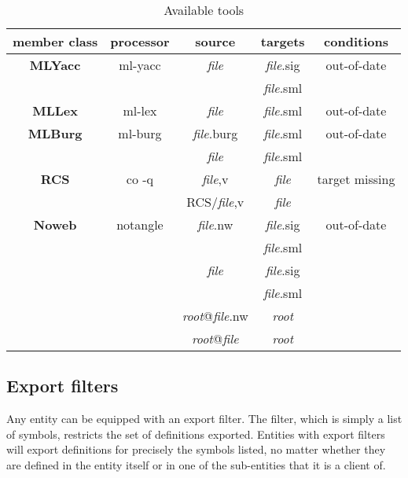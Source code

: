 \documentclass{article}
\begin{document}
\begin{table}
\begin{center}
\begin{tabular}{||c|c|c|c|c||}
\hline
member class & processor & source & targets & conditions \\
\hline\hline
{\bf MLYacc} & ml-yacc & {\em file} & {\em file}.sig & out-of-date \\
             &         &            & {\em file}.sml & \\
\hline
{\bf MLLex} & ml-lex & {\em file} & {\em file}.sml & out-of-date \\
\hline
{\bf MLBurg} & ml-burg & {\em file}.burg & {\em file}.sml & out-of-date \\
\cline{3-4}
             &         & {\em file} & {\em file}.sml & \\
\hline
{\bf RCS} & co -q & {\em file},v & {\em file} & target missing \\
\cline{3-4}
          &       & RCS/{\em file},v & {\em file} & \\
\hline
{\bf Noweb} & notangle & {\em file}.nw & {\em file}.sig & out-of-date \\
            &          &               & {\em file}.sml & \\
\cline{3-4}
            &          & {\em file}    & {\em file}.sig & \\
            &          &               & {\em file}.sml & \\
\cline{3-4}
            &          & {\em root}@{\em file}.nw & {\em root} & \\
\cline{3-4}
            &          & {\em root}@{\em file} & {\em root} & \\
\hline
\end{tabular}
\end{center}
\caption{Available tools}
\label{tab:tools}
\end{table}

\subsection{Export filters}

Any entity can be equipped with an export filter.  The filter, which
is simply a list of symbols, restricts the set of definitions
exported.  Entities with export filters will export definitions for
precisely the symbols listed, no matter whether they are defined in the
entity itself or in one of the sub-entities that it is a client of.
\end{document}
